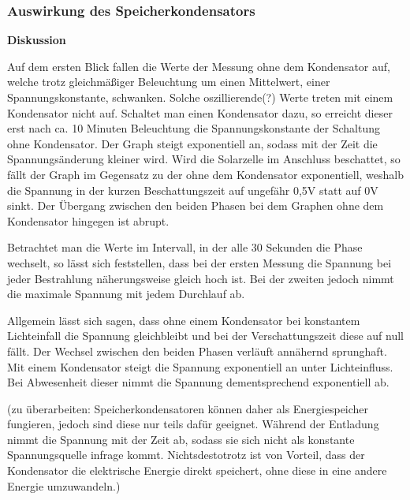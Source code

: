 \documentclass{etit-workshop-protokoll}
\begin{document}
    \subsubsection{Auswirkung des Speicherkondensators}                 %
        \textbf{Diskussion}
        \newline
        \par Auf dem ersten Blick fallen die Werte der Messung ohne dem Kondensator auf, welche trotz gleichmäßiger Beleuchtung um einen Mittelwert, einer Spannungskonstante, schwanken. Solche oszillierende(?) Werte treten mit einem Kondensator nicht auf. Schaltet man einen Kondensator dazu, so erreicht dieser erst nach ca. 10 Minuten Beleuchtung die Spannungskonstante der Schaltung ohne Kondensator. Der Graph steigt exponentiell an, sodass mit der Zeit die Spannungsänderung kleiner wird. Wird die Solarzelle im Anschluss beschattet, so fällt der Graph im Gegensatz zu der ohne dem Kondensator exponentiell, weshalb die Spannung in der kurzen Beschattungszeit auf ungefähr 0,5V statt auf 0V sinkt. Der Übergang zwischen den beiden Phasen bei dem Graphen ohne dem Kondensator hingegen ist abrupt.
        \par Betrachtet man die Werte im Intervall, in der alle 30 Sekunden die Phase wechselt, so lässt sich feststellen, dass bei der ersten Messung die Spannung bei jeder Bestrahlung näherungsweise gleich hoch ist. Bei der zweiten jedoch nimmt die maximale Spannung mit jedem Durchlauf ab. 
        \par Allgemein lässt sich sagen, dass ohne einem Kondensator bei konstantem Lichteinfall die Spannung gleichbleibt und bei der Verschattungszeit diese auf null fällt. Der Wechsel zwischen den beiden Phasen verläuft annähernd sprunghaft. Mit einem Kondensator steigt die Spannung exponentiell an unter Lichteinfluss. Bei Abwesenheit dieser nimmt die Spannung dementsprechend exponentiell ab.
        
        
        
        
        
        \par (zu überarbeiten: Speicherkondensatoren können daher als Energiespeicher fungieren, jedoch sind diese nur teils dafür geeignet. Während der Entladung nimmt die Spannung mit der Zeit ab, sodass sie sich nicht als konstante Spannungsquelle infrage kommt.
        Nichtsdestotrotz ist von Vorteil, dass der Kondensator die elektrische Energie direkt speichert, ohne diese in eine andere Energie umzuwandeln.)
\end{document}
